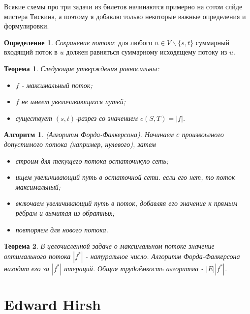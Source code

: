 \documentclass[a4paper]{article}
\theoremstyle{indented}
\newtheorem{theorem}{Теорема}
\newtheorem{alg}{Алгоритм}
\theoremstyle{definition}
\newtheorem{defn}{Определение}
\theoremstyle{remark}
\begin{document}
Всякие схемы про три задачи из билетов начинаются примерно на сотом слйде мистера Тискина, а поэтому я добавлю только некоторые важные определения и формулировки.

\begin{defn}
    \textit{Сохранение потока}: для любого $u \in V \backslash \{s, t\}$ суммарный входящий поток в $u$ должен равняться суммарному исходящему потоку из $u$. 
\end{defn}

\begin{theorem}
    Следующие утверждения равносильны:

    \begin{itemize}
        \item $f$ - максимальный поток; 
        \item $f$ не имеет увеличивающихся путей; 
        \item существует $(s, t)$-разрез со значением $c(S, T) = |f|$. 
    \end{itemize}
\end{theorem}

\begin{alg}
    (Алгоритм Форда-Фалкерсона). Начинаем с произвоьлного допустимого потока (например, нулевого), затем

    \begin{itemize}
        \item строим для текущего потока остаточнкую сеть;
        \item ищем увеличивающий путь в остаточной сети. если его нет, то поток максимальный; 
        \item включаем увеличивающий путь в поток, добавляя его значение к прямым рёбрам и вычитая из обратных; 
        \item повторяем для нового потока.
    \end{itemize}
\end{alg}

\begin{theorem}
    В целочисленной задаче о максимальном потоке значение оптимального потока $|f^*|$ - натуральное число. Алгоритм Форда-Фалкерсона находит его за $|f^*|$ итераций. Общая трудоёмкость алгоритма - $|E||f^*|$. 
\end{theorem}

\newpage

\section{Edward Hirsh}
\end{document}

